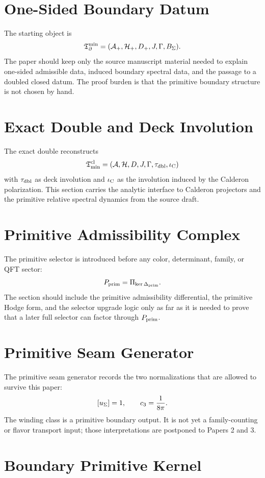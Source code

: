 \documentclass[11pt,a4paper]{article}
\begin{document}
\section{One-Sided Boundary Datum}

The starting object is
\[
\mathfrak T_{\partial}^{\min}=(\mathcal A_+,\mathcal H_+,D_+,J,\Gamma,B_\Sigma).
\]
The paper should keep only the source manuscript material needed to explain one-sided admissible
data, induced boundary spectral data, and the passage to a doubled closed datum. The proof burden is
that the primitive boundary structure is not chosen by hand.

\section{Exact Double and Deck Involution}

The exact double reconstructs
\[
\mathfrak T_{\mathrm{min}}^{\mathrm{cl}}=(\mathcal A,\mathcal H,D,J,\Gamma,\tau_{\mathrm{dbl}},\iota_{\mathrm C})
\]
with $\tau_{\mathrm{dbl}}$ as deck involution and $\iota_{\mathrm C}$ as the involution induced by the Calderon polarization.
This section carries the analytic interface to Calderon projectors and the primitive relative
spectral dynamics from the source draft.

\section{Primitive Admissibility Complex}

The primitive selector is introduced before any color, determinant, family, or QFT sector:
\[
P_{\mathrm{prim}}=\Pi_{\ker\Delta_{\mathrm{prim}}}.
\]
The section should include the primitive admissibility differential, the primitive Hodge form, and
the selector upgrade logic only as far as it is needed to prove that a later full selector can
factor through $P_{\mathrm{prim}}$.

\section{Primitive Seam Generator}

The primitive seam generator records the two normalizations that are allowed to survive this paper:
\[
[u_\Sigma]=1,
\qquad
c_3=\frac{1}{8\pi}.
\]
The winding class is a primitive boundary output. It is not yet a family-counting or flavor
transport input; those interpretations are postponed to Papers 2 and 3.

\section{Boundary Primitive Kernel}
\end{document}
